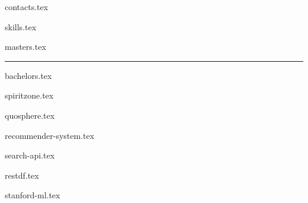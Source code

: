 \documentclass[11pt]{article}
\begin{document}
{contacts.tex}



{skills.tex}



{masters.tex}

\par\noindent\rule{\textwidth}{0.4pt}

{bachelors.tex}



{spiritzone.tex}

{quosphere.tex}



{recommender-system.tex}

{search-api.tex}

{restdf.tex}



{stanford-ml.tex}
\end{document}
